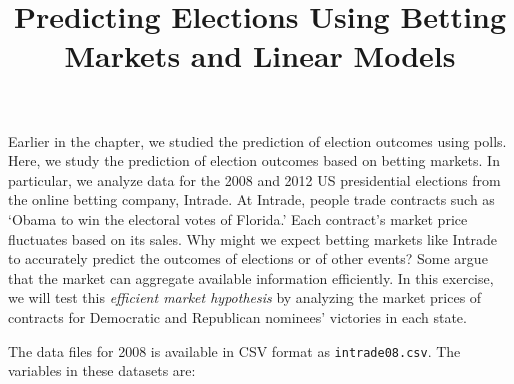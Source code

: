 \documentclass[]{article}
\title{Predicting Elections Using Betting Markets and Linear Models}
\author{}
\date{}
\begin{document}
\maketitle


Earlier in the chapter, we studied the prediction of election outcomes
using polls. Here, we study the prediction of election outcomes based on
betting markets. In particular, we analyze data for the 2008 and 2012 US
presidential elections from the online betting company, Intrade. At
Intrade, people trade contracts such as `Obama to win the electoral
votes of Florida.' Each contract's market price fluctuates based on its
sales. Why might we expect betting markets like Intrade to accurately
predict the outcomes of elections or of other events? Some argue that
the market can aggregate available information efficiently. In this
exercise, we will test this \emph{efficient market hypothesis} by
analyzing the market prices of contracts for Democratic and Republican
nominees' victories in each state.

The data files for 2008 is available in CSV format as
\texttt{intrade08.csv}. The variables in these datasets are:
\end{document}
